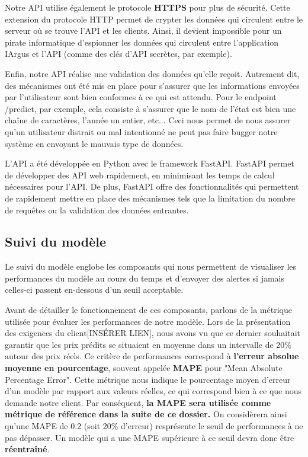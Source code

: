 \documentclass[french]{article}
\begin{document}
    Notre API utilise également le protocole \textbf{HTTPS} pour plus de sécurité. Cette extension du protocole HTTP permet de crypter les données qui circulent entre le serveur où se trouve l'API et les clients. Ainsi, il devient impossible pour un pirate informatique d'espionner les données qui circulent entre l'application IArgus et l'API (comme des clés d'API secrètes, par exemple).

    Enfin, notre API réalise une validation des données qu'elle reçoit. Autrement dit, des mécanismes ont été mis en place pour s'assurer que les informations envoyées par l'utilisateur sont bien conformes à ce qui est attendu. Pour le endpoint /predict, par exemple, cela consiste à s'assurer que le nom de l'état est bien une chaîne de caractères, l'année un entier, etc... Ceci nous permet de nous assurer qu'un utilisateur distrait ou mal intentionné ne peut pas faire bugger notre système en envoyant le mauvais type de données.

    L'API a été développée en Python avec le framework FastAPI. FastAPI permet de développer des API web rapidement, en minimisant les temps de calcul nécessaires pour l'API. De plus, FastAPI offre des fonctionnalités qui permettent de rapidement mettre en place des mécanismes tels que la limitation du nombre de requêtes ou la validation des données entrantes.
    \subsection{Suivi du modèle}

    Le suivi du modèle englobe les composants qui nous permettent de visualiser les performances du modèle au cours du temps et d'envoyer des alertes si jamais celles-ci passent en-dessous d'un seuil acceptable. 
    
    Avant de détailler le fonctionnement de ces composants, parlons de la métrique utilisée pour évaluer les performances de notre modèle. Lors de la présentation des exigences du client[INSÉRER LIEN], nous avons vu que ce dernier souhaitait garantir que les prix prédits se situaient en moyenne dans un intervalle de 20\% autour des prix réels. Ce critère de performances correspond à \textbf{l'erreur absolue moyenne en pourcentage}, souvent appelée \textbf{MAPE} pour "Mean Absolute Percentage Error". Cette métrique nous indique le pourcentage moyen d'erreur d'un modèle par rapport aux valeurs réelles, ce qui correspond bien à ce que nous demande notre client. Par conséquent, \textbf{la MAPE sera utilisée comme métrique de référence dans la suite de ce dossier.} On considèrera ainsi qu'une MAPE de 0.2 (soit 20\% d'erreur) resprésente le seuil de performances à ne pas dépasser. Un modèle qui a une MAPE supérieure à ce seuil devra donc être \textbf{réentraîné}.
\end{document}
